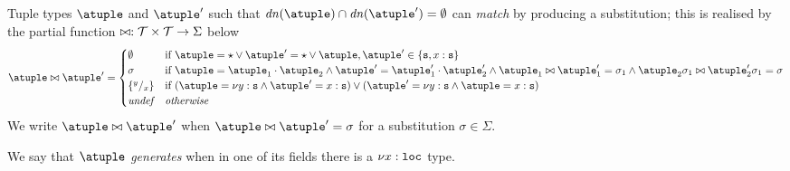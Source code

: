 Tuple types $\atuple$ and $\atuple'$ such that
$\dn{\atuple}\cap\dn{\atuple'} = \emptyset$
can \emph{match} by producing a substitution;
this is realised by the partial function
$\matches : \tupleset \times \tupleset \to \Sigma$ below
\[
  \atuple \matches \atuple' \generates
    \begin{cases}
     \emptyset
    & 
    \text{if  } \atuple = \wildcard \vee \atuple' = \wildcard  \vee 
    \atuple,\atuple'\in\{\asort, x : \asort\}
    \\
    \sigma
    &
    \text{if } \atuple = \atuple_1 \cdot \atuple_2
    \land  \atuple' = \atuple'_1 \cdot \atuple'_2
    \land \atuple_1 \matches \atuple'_1 \generates \sigma_1
    \land \atuple_2\sigma_1 \matches \atuple'_2\sigma_1 \generates \sigma
    \\
    \sust x y 
    &
    \text{if  } (\atuple = \nu y : \asort \land \atuple' = x: \asort) \vee  (\atuple' = \nu y : \asort \land \atuple = x: \asort) 
    \\
    \textit{undef} & \textit{otherwise}
   \end{cases}
\]
%
We write $\atuple \matches \atuple'$ when
$\atuple \matches \atuple' = \sigma$ for a substitution
$\sigma \in \Sigma$.
%
%
%

\noindent
We say that $\atuple$ \emph{generates} when in one of its fields there
is a $\nu x: \asort[loc]$ type. 
%

%



